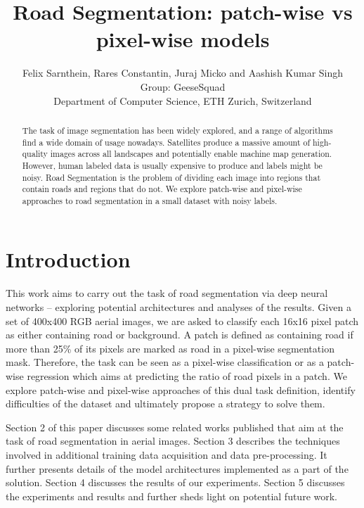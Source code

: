 \documentclass[10pt,conference,compsocconf]{IEEEtran}
\begin{document}
\title{Road Segmentation: patch-wise vs pixel-wise models}

\author{
  Felix Sarnthein, Rares Constantin, Juraj Micko and Aashish Kumar Singh\\
  Group: GeeseSquad \\
  Department of Computer Science, ETH Zurich, Switzerland
}

\maketitle

\begin{abstract}
  The task of image segmentation has been widely explored, and a range of algorithms find a wide domain of usage nowadays. Satellites produce a massive amount of high-quality images across all landscapes and potentially enable machine map generation. However, human labeled data is usually expensive to produce and labels might be noisy. Road Segmentation is the problem of dividing each image into regions that contain roads and regions that do not. We explore patch-wise and pixel-wise approaches to road segmentation in a small dataset with noisy labels.
\end{abstract}

\section{Introduction}
This work aims to carry out the task of road segmentation via deep neural networks -- exploring potential architectures and analyses of the results. Given a set of 400x400 RGB aerial images, we are asked to classify each 16x16 pixel patch as either containing road or background. A patch is defined as containing road if more than 25\% of its pixels are marked as road in a pixel-wise segmentation mask. Therefore, the task can be seen as a pixel-wise classification or as a patch-wise regression which aims at predicting the ratio of road pixels in a patch. We explore patch-wise and pixel-wise approaches of this dual task definition, identify difficulties of the dataset and ultimately propose a strategy to solve them.

Section 2 of this paper discusses some related works published that aim at the task of road segmentation in aerial images. Section 3 describes the techniques involved in additional training data acquisition and data pre-processing. It further presents details of the model architectures implemented as a part of the solution. Section 4 discusses the results of our experiments. Section 5 discusses the experiments and results and further sheds light on potential future work.
\end{document}
